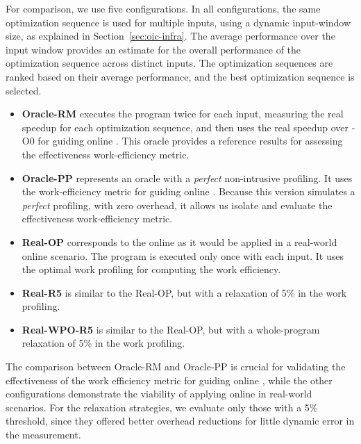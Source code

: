 For comparison, we use five configurations.
In all configurations, the same optimization sequence is used for multiple inputs, using a dynamic input-window size, as explained in Section~\ref{sec:oic-infra}.
The average performance over the input window provides an estimate for the overall performance of the optimization sequence across distinct inputs.
The optimization sequences are ranked based on their average performance, and the best optimization sequence is selected.
\begin{itemize}[leftmargin=3mm]
\item \textbf{Oracle-RM} executes the program twice for each input, measuring the real speedup for each optimization sequence, and then uses the real speedup over {\flagstype -O0} for guiding online {\itercomp}. This oracle provides a reference results for assessing the effectiveness work-efficiency metric.
\item \textbf{Oracle-PP} represents an oracle with a \textit{perfect} non-intrusive profiling.
  It uses the work-efficiency metric for guiding online {\itercomp}.
  Because this version simulates a \textit{perfect} profiling, with zero overhead,
  it allows us isolate and evaluate the effectiveness work-efficiency metric.
\item \textbf{Real-OP} corresponds to the online {\itercomp} as it would be applied in a real-world online scenario.
  The program is executed only once with each input.
  It uses the optimal work profiling for computing the work efficiency.
\item \textbf{Real-R5} is similar to the {Real-OP}, but with a relaxation of 5\% in the work profiling.
\item \textbf{Real-WPO-R5} is similar to the {Real-OP}, but with a whole-program relaxation of 5\% in the work profiling.
\end{itemize}

The comparison between Oracle-RM and Oracle-PP is crucial for validating the
effectiveness of the work efficiency metric for guiding online {\itercomp},
while the other configurations demonstrate the viability of applying online
{\itercomp} in real-world scenarios.
For the relaxation strategies, we evaluate only those with a 5\% threshold, since
they offered better overhead reductions for little dynamic error in the measurement.

